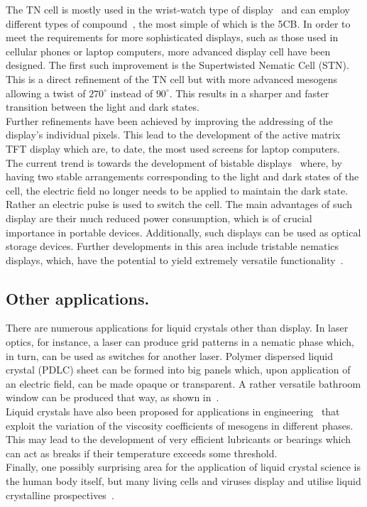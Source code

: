 The TN cell is mostly used in the wrist-watch type of display~\cite{Geelhaar98} and can employ
different types of compound~\cite{Eidenschink85,Eidenschink89}, the most simple of which is the 
5CB. In order to meet the requirements for more sophisticated displays, such as those used in 
cellular phones or  laptop computers, more advanced display cell have been designed. The first 
such improvement is the Supertwisted Nematic Cell (STN). This is a direct refinement of the TN 
cell but with more advanced mesogens allowing a twist of $270^\circ$ instead of $90^\circ$. This 
results in a sharper and faster transition between the light and dark states.\\
Further refinements have been achieved by improving the addressing of the display's individual
pixels. This lead to the development of the active matrix TFT display which are, to date, the most
used screens for laptop computers.\\
The current trend is towards the development of bistable  
displays~\cite{KreuzerTschudi92,GiocondoLelidis99,DavidsonMottram02}
where, by having two stable arrangements corresponding to the light and dark states of the cell, the
electric field no longer needs to be applied to maintain the dark state. Rather an
electric pulse is used to switch the cell. The main advantages of such display are their much
reduced power consumption, which is of crucial importance in portable devices. Additionally, such
displays can be used as optical storage devices. Further developments in this area include 
tristable nematics displays, which, have the potential to yield extremely versatile
functionality~\cite{KimYoneya02}.

\subsection{Other applications.}

There are numerous applications for liquid crystals other than display. In laser optics, for
instance, a laser can produce grid patterns in a nematic phase which, in turn, can be used as
switches for another laser. Polymer dispersed liquid crystal (PDLC) sheet can be formed into
big panels which, upon application of an electric field, can be made opaque or transparent. A
rather versatile bathroom window can be produced that way, as shown in~\cite{Intro_LC}.\\
Liquid crystals have also been proposed for applications in 
engineering~\cite{Eidenschink88,Eidenschink89a,EidenschinkKonrath99} that exploit the variation of
the viscosity coefficients of mesogens in different phases. This may lead to the development of
very efficient lubricants or bearings which can act as breaks if their temperature exceeds some
threshold.\\
Finally, one possibly surprising area for the application of liquid crystal science is the human body
itself, but many living cells and viruses display and utilise liquid crystalline 
prospectives~\cite{Goodby98}.

